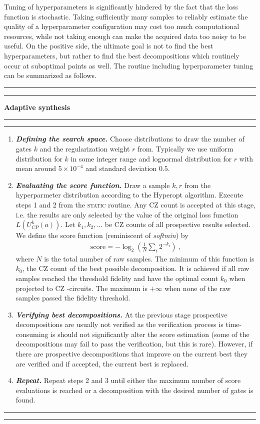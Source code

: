 \documentclass[twocolumn, amsfonts, amssymb, aps, nofootinbib]{revtex4-2}
\newcommand{\CZ}{\textsf{CZ }}
\newcommand{\static}{\textsc{static }}
\begin{document}
Tuning of hyperparameters is significantly hindered by the fact that the loss function is stochastic. Taking sufficiently many samples to reliably estimate the quality of a hyperparameter configuration may cost too much computational resources, while not taking enough can make the acquired data too noisy to be useful. On the positive side, the ultimate goal is not to find the best hyperparameters, but rather to find the best decompositions which routinely occur at suboptimal points as well. The routine including hyperparameter tuning can be summarized as follows.
\\[6pt]
\hrule
\hrule
\vspace{6pt}
{\large\textbf{\qquad Adaptive synthesis}}
\vspace{6pt}
\hrule
\hrule
\begin{enumerate}
\item \textit{\textbf{Defining the search space.}} Choose distributions to draw the number of gates $k$ and the regularization weight $r$ from. Typically we use uniform distribution for $k$ in some integer range and lognormal distribution for $r$ with mean around $5\times 10^{-4}$ and standard deviation $0.5$.
\item \textit{\textbf{Evaluating the score function.}} Draw a sample $k, r$ from the hyperparmeter distribution according to the Hyperopt algorithm. Execute steps 1 and 2 from the \static routine. Any \CZ count is accepted at this stage, i.e. the results are only selected by the value of the original loss function $L(U_{CP}^k(a))$. Let $k_1, k_2,\dots$ be \CZ counts of all prospective results selected. We define the score function (reminiscent of \textit{softmin}) by
\begin{align}
\text{score}=-\log_2\left(\frac{1}{N}\sum_{i}2^{-k_i}\right) \label{score} \ ,
\end{align}
where $N$ is the total number of raw samples. The minimum of this function is $k_0$, the \CZ count of the best possible decomposition. It is achieved if all raw samples reached the threshold fidelity and have the optimal count $k_0$ when projected to \CZ-circuits. The maximum is $+\infty$ when none of the raw samples passed the fidelity threshold.
\item \textit{\textbf{Verifying best decompositions.}} At the previous stage prospective decompositions are usually not verified as the verification process is time-consuming is should not significantly alter the score estimation (some of the decompositions may fail to pass the verification, but this is rare). However, if there are prospective decompositions that improve on the current best they are verified and if accepted, the current best is replaced.

\item \textit{\textbf{Repeat.}} Repeat steps 2 and 3 until either the maximum number of score evaluations is reached or a decomposition with the desired number of gates is found.
\end{enumerate}
\hrule
\hrule
\vspace{6pt}
\end{document}
